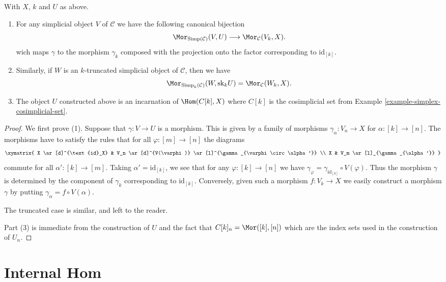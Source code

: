 \begin{lemma}
\label{lemma-morphism-into-product}
With $X$, $k$ and $U$ as above.
\begin{enumerate}
\item For any simplicial object $V$ of
$\mathcal{C}$ we have the following
canonical bijection
$$
\Mor_{\text{Simp}(\mathcal{C})}(V, U)
\longrightarrow
\Mor_\mathcal{C}(V_k, X).
$$
wich maps $\gamma$ to the morphism $\gamma_k$ composed with
the projection onto the factor corresponding to $\text{id}_{[k]}$.
\item Similarly, if $W$ is an $k$-truncated simplicial object
of $\mathcal{C}$, then we have
$$
\Mor_{\text{Simp}_k(\mathcal{C})}(W, \text{sk}_k U)
=
\Mor_\mathcal{C}(W_k, X).
$$
\item The object $U$ constructed above is an
incarnation of $\Hom(C[k], X)$ where $C[k]$ is the cosimplicial set from
Example \ref{example-simplex-cosimplicial-set}.
\end{enumerate}
\end{lemma}

\begin{proof}
We first prove (1).
Suppose that $\gamma : V \to U$ is a morphism.
This is given by a family of morphisms
$\gamma_{\alpha} : V_n \to X$ for $\alpha : [k] \to [n]$.
The morphisms have to satisfy the
rules that for all $\varphi : [m] \to [n]$ the diagrams
$$
\xymatrix{
X \ar[d]^{\text{id}_X} &
V_n \ar[d]^{V(\varphi)}
\ar[l]^{\gamma_{\varphi \circ \alpha'}} \\
X &
V_m \ar[l]_{\gamma_{\alpha'}}
}
$$
commute for all $\alpha' : [k] \to [m]$.
Taking $\alpha' = \text{id}_{[k]}$, we see that
for any $\varphi : [k] \to [n]$ we have $\gamma_\varphi =
\gamma_{\text{id}_{[k]}} \circ V(\varphi)$. Thus the morphism
$\gamma$ is determined by the component of $\gamma_k$
corresponding to $\text{id}_{[k]}$. Conversely,
given such a morphism $f : V_k \to X$ we easily
construct a morphism $\gamma$ by putting
$\gamma_\alpha = f \circ V(\alpha)$.

\medskip\noindent
The truncated case is similar, and left to the reader.

\medskip\noindent
Part (3) is immediate from the construction of $U$ and the
fact that $C[k]_n = \Mor([k], [n])$ which are the index sets
used in the construction of $U_n$.
\end{proof}




\section{Internal Hom}
\label{section-internal-hom}

